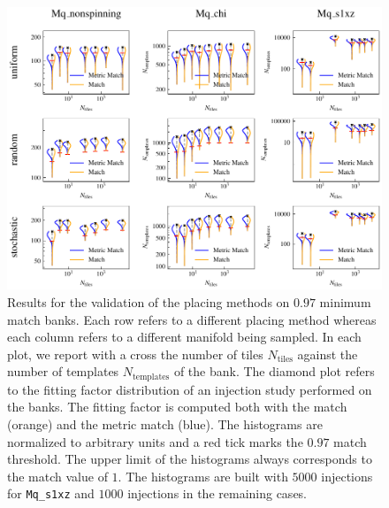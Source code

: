 \documentclass[twocolumn,showpacs,preprintnumbers,nofootinbib,prd,
superscriptaddress,10pt]{revtex4-2}
\begin{document}
\begin{figure}[th!]
	\centering
	\includegraphics[width=.85\textwidth,keepaspectratio]{placing_validation}
	\caption{Results for the validation of the placing methods on $0.97$ minimum match banks. Each row refers to a different placing method whereas each column refers to a different manifold being sampled. In each plot, we report with a cross the number of tiles $N_{\text{tiles}}$ against the number of templates $N_{\text{templates}}$ of the bank.
	The diamond plot refers to the fitting factor distribution of an injection study performed on the banks. The fitting factor is computed both with the match (orange) and the metric match (blue). The histograms are normalized to arbitrary units and a red tick marks the $0.97$ match threshold. The upper limit of the histograms always corresponds to the match value of $1$.
	The histograms are built with $5000$ injections for \texttt{Mq\_s1xz} and $1000$ injections in the remaining cases.
	}
	\label{fig:placing_validation}
\end{figure}
\end{document}
